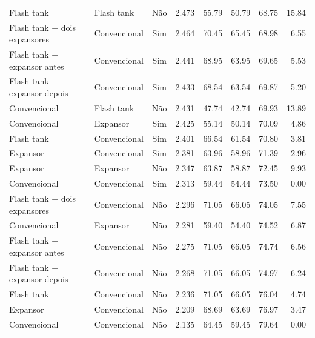 {\begin{tabular}{llcrrrrr}
Flash tank & Flash tank & Não & 2.473 & 55.79 & 50.79 & 68.75 & 15.84 \\
Flash tank + dois expansores & Convencional & Sim & 2.464 & 70.45 & 65.45 & 68.98 & 6.55 \\
Flash tank + expansor antes & Convencional & Sim & 2.441 & 68.95 & 63.95 & 69.65 & 5.53 \\
Flash tank + expansor depois & Convencional & Sim & 2.433 & 68.54 & 63.54 & 69.87 & 5.20 \\
Convencional & Flash tank & Não & 2.431 & 47.74 & 42.74 & 69.93 & 13.89 \\
Convencional & Expansor & Sim & 2.425 & 55.14 & 50.14 & 70.09 & 4.86 \\
Flash tank & Convencional & Sim & 2.401 & 66.54 & 61.54 & 70.80 & 3.81 \\
Expansor & Convencional & Sim & 2.381 & 63.96 & 58.96 & 71.39 & 2.96 \\
Expansor & Expansor & Não & 2.347 & 63.87 & 58.87 & 72.45 & 9.93 \\
Convencional & Convencional & Sim & 2.313 & 59.44 & 54.44 & 73.50 & 0.00 \\
Flash tank + dois expansores & Convencional & Não & 2.296 & 71.05 & 66.05 & 74.05 & 7.55 \\
Convencional & Expansor & Não & 2.281 & 59.40 & 54.40 & 74.52 & 6.87 \\
Flash tank + expansor antes & Convencional & Não & 2.275 & 71.05 & 66.05 & 74.74 & 6.56 \\
Flash tank + expansor depois & Convencional & Não & 2.268 & 71.05 & 66.05 & 74.97 & 6.24 \\
Flash tank & Convencional & Não & 2.236 & 71.05 & 66.05 & 76.04 & 4.74 \\
Expansor & Convencional & Não & 2.209 & 68.69 & 63.69 & 76.97 & 3.47 \\
Convencional & Convencional & Não & 2.135 & 64.45 & 59.45 & 79.64 & 0.00 \\
\bottomrule
\end{tabular}
}
